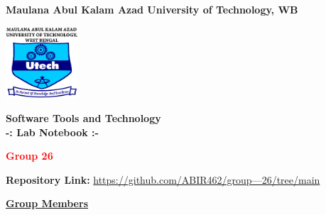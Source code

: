 \documentclass[a4paper,12pt]{article}
\begin{document}
\begin{titlepage}
    \centering
    \vspace*{0 cm}
    \LARGE
    \textbf{Maulana Abul Kalam Azad University of Technology, WB}
    \vspace{0.5cm}
    
    \includegraphics[width=0.2\textwidth]{makaut.png} %
    \vspace{0.5cm}
    
    \Large
    \textbf{\textcolor{blue!60}{Software Tools and Technology\\
        -: Lab Notebook :-}}
    \vspace{0.5cm}
    
    \large
    \textbf{\textcolor{red}{Group 26}}
    \vspace{1 cm}
    
    \textbf{Repository Link:} \href{https://github.com/ABIR462/group---26/tree/main}{https://github.com/ABIR462/group---26/tree/main}
    \vspace{1cm}
    
    \textbf{\underline{\textcolor{blue!60}{Group Members}}}
    \vspace{0.5cm}


\end{titlepage}
\end{document}
